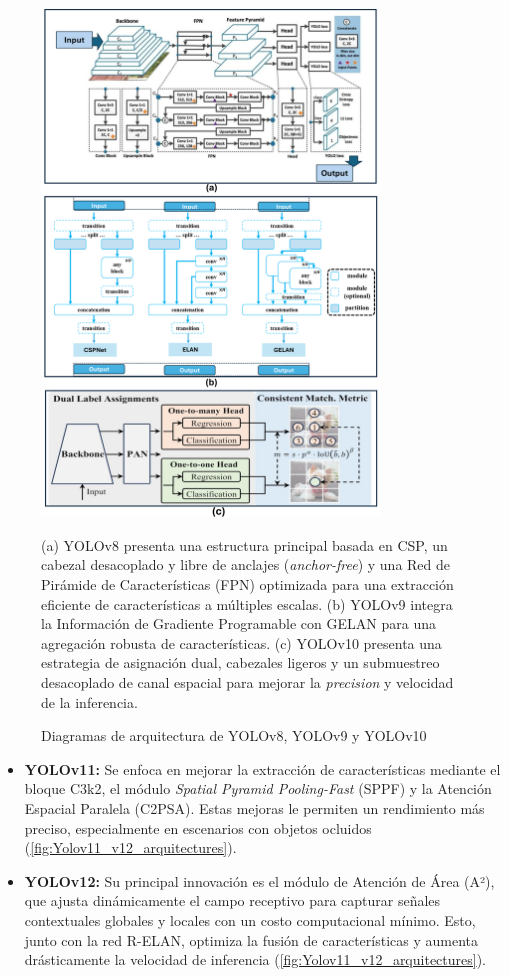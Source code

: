 \documentclass[12pt,a4paper,onecolumn,oneside]{report}
\begin{document}
\begin{figure}[htbp]
  \centering
  \includegraphics[width=0.8\textwidth]{figuras/arquitecture YOLO/v8_v9_v10.png}
  \caption{Diagramas de arquitectura de YOLOv8, YOLOv9 y YOLOv10}
  \label{fig:Yolov8_v9_v10_arquitectures}
  (a) YOLOv8 presenta una estructura principal basada en CSP, un cabezal desacoplado y libre de anclajes (\textit{anchor-free}) y una Red de Pirámide de Características (FPN) optimizada para una extracción eficiente de características a múltiples escalas. 
  (b) YOLOv9 integra la Información de Gradiente Programable con GELAN para una agregación robusta de características.
  (c) YOLOv10 presenta una estrategia de asignación dual, cabezales ligeros y un submuestreo desacoplado de canal espacial para mejorar la \textit{precision} y velocidad de la inferencia.
\end{figure}

\begin{itemize}
  \item \textbf{YOLOv11:} Se enfoca en mejorar la extracción de características mediante el bloque C3k2, el módulo \textit{Spatial Pyramid Pooling-Fast} (SPPF) y la Atención Espacial Paralela (C2PSA). Estas mejoras le permiten un rendimiento más preciso, especialmente en escenarios con objetos ocluidos \cite{defyolos} (\autoref{fig:Yolov11_v12_arquitectures}).
  \item \textbf{YOLOv12:} Su principal innovación es el módulo de Atención de Área (A²), que ajusta dinámicamente el campo receptivo para capturar señales contextuales globales y locales con un costo computacional mínimo. Esto, junto con la red R-ELAN, optimiza la fusión de características y aumenta drásticamente la velocidad de inferencia \cite{defyolos} (\autoref{fig:Yolov11_v12_arquitectures}).
\end{itemize}
\end{document}
